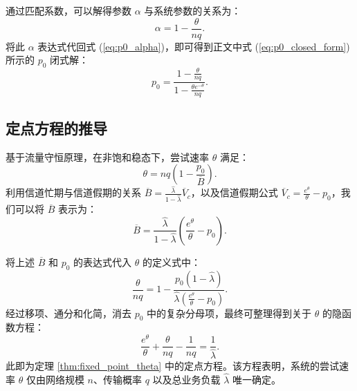 通过匹配系数，可以解得参数 $\alpha$ 与系统参数的关系为：
\begin{equation}
	\alpha = 1 - \frac{\theta}{n q}.
\end{equation}
将此 $\alpha$ 表达式代回式 (\ref{eq:p0_alpha})，即可得到正文中式 (\ref{eq:p0_closed_form}) 所示的 $p_0$ 闭式解：
\begin{equation}
	p_0 = \frac{1 - \frac{\theta}{n q}}{1 - \frac{\theta e^{-\theta}}{n q}}.
\end{equation}

\subsection{定点方程的推导}

基于流量守恒原理，在非饱和稳态下，尝试速率 $\theta$ 满足：
\begin{equation}
	\theta = n q \left( 1 - \frac{p_0}{\overline{B}} \right).
\end{equation}
利用信道忙期与信道假期的关系 $\overline{B} = \frac{\hat{\lambda}}{1 - \hat{\lambda}} \overline{V}_c$，以及信道假期公式 $\overline{V}_c = \frac{e^{\theta}}{\theta} - p_0$，我们可以将 $\overline{B}$ 表示为：
\begin{equation}
	\overline{B} = \frac{\hat{\lambda}}{1 - \hat{\lambda}} \left( \frac{e^{\theta}}{\theta} - p_0 \right).
\end{equation}

将上述 $\overline{B}$ 和 $p_0$ 的表达式代入 $\theta$ 的定义式中：
\begin{equation}
	\frac{\theta}{n q} = 1 - \frac{p_0 (1 - \hat{\lambda})}{\hat{\lambda} (\frac{e^{\theta}}{\theta} - p_0)}.
\end{equation}
经过移项、通分和化简，消去 $p_0$ 中的复杂分母项，最终可整理得到关于 $\theta$ 的隐函数方程：
\begin{equation}
	\frac{e^{\theta}}{\theta} + \frac{\theta}{n q} - \frac{1}{n q} = \frac{1}{\hat{\lambda}}.
\end{equation}
此即为定理 \ref{thm:fixed_point_theta} 中的定点方程。该方程表明，系统的尝试速率 $\theta$ 仅由网络规模 $n$、传输概率 $q$ 以及总业务负载 $\hat{\lambda}$ 唯一确定。



